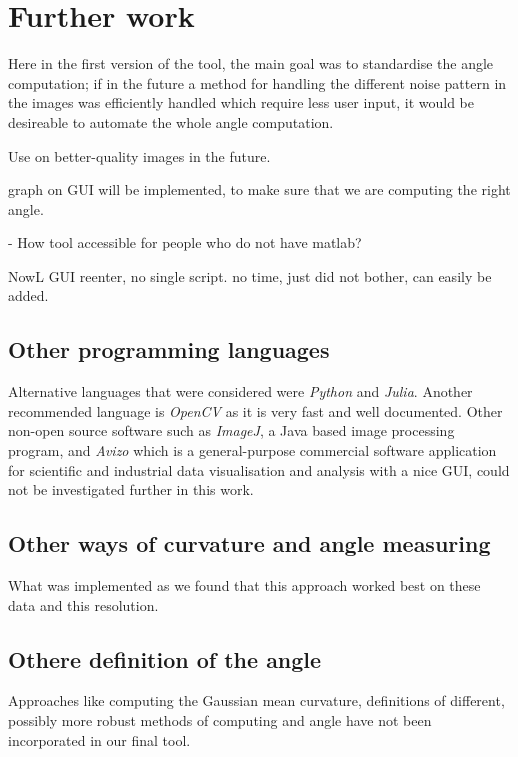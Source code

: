 \section{Further work}

Here in the first version of the tool, the main goal was to standardise the angle computation; if in the future  a method for handling the different noise pattern in the images was efficiently handled which require less user input, it would be desireable to automate the whole angle computation.

Use on better-quality images in the future.


graph on GUI will be implemented, to make sure that we are computing the right angle.


- How tool accessible for people who do not have matlab?

NowL GUI reenter, no single script. no time, just did not bother, can easily be added.



\subsection{Other programming languages}

Alternative languages that were considered were \textit{Python} and \textit{Julia}. Another recommended language is \textit{OpenCV} as it is very fast and well documented. Other non-open source software such as \textit{ImageJ}, a Java based image processing program, and \textit{Avizo} which is a general-purpose commercial software application for scientific and industrial data visualisation and analysis with a nice GUI, could not be investigated further in this work. 


\subsection{Other ways of curvature and angle measuring}

What was implemented as we found that this approach worked best on these data and this resolution.

\subsection{Othere definition of the angle}
Approaches like computing the Gaussian mean curvature, definitions of different, possibly more robust methods of computing and angle %
have not been incorporated in our final tool. 

